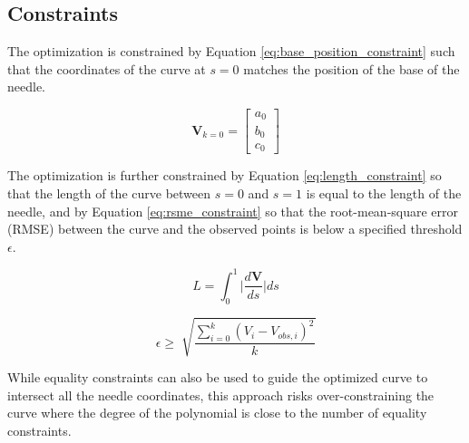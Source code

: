\subsection{Constraints}
The optimization is constrained by Equation \ref{eq:base_position_constraint} such that the coordinates of the curve at $s=0$ matches the position of the base of the needle.
 
 \begin{equation}
 \label{eq:base_position_constraint}
 \textbf{V}_{k=0}=\begin{bmatrix} a_0 \\ b_0 \\ c_0 \end{bmatrix}
 \end{equation}

The optimization is further constrained by Equation \ref{eq:length_constraint} so that the length of the curve between $s=0$ and $s=1$ is equal to the length of the needle, and by Equation \ref{eq:rsme_constraint} so that the root-mean-square error (RMSE) between the curve and the observed points is below a specified threshold $\epsilon$.

\begin{equation}
\label{eq:length_constraint}
L = \int_0^1 \lvert\frac{d\textbf{V}}{ds}\rvert ds
\end{equation}

\begin{equation}
\label{eq:rsme_constraint}
\epsilon \geq \sqrt[]{\frac{\sum_{i=0}^{k}(V_i - V_{obs,i})^2}{k}}
\end{equation}

While equality constraints can also be used to guide the optimized curve to intersect all the needle coordinates, this approach risks over-constraining the curve where the degree of the polynomial is close to the number of equality constraints.


